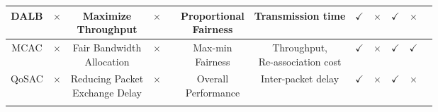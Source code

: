\begin{table*}
\begin{tabular}{|c|c|c|c|c|c|c|c|c|c|c|c|}
		DALB \cite{Demand-aware-LB-Association-15}& $\times$ & \makecell{Maximize\\ Throughput}  &$\times$&  & \makecell{Proportional\\ Fairness} &Transmission time&$\checkmark$&$\times$&$\checkmark$&$\times$\\\hline
		MCAC \cite{Migration-DAM}& $\times$ & \makecell{Fair Bandwidth\\ Allocation}  &$\times$&  & \makecell{Max-min\\ Fairness}  &\makecell{Throughput,\\Re-association cost}&$\checkmark$&\tiny$\times$&$\checkmark$&$\checkmark$		\\\hline
		QoSAC \cite{flow-level-DAM} & $\times$ & \makecell{Reducing Packet \\ Exchange Delay} &$\times$ &  & \makecell{Overall\\ Performance}  &Inter-packet delay&$\checkmark$&$\times$&$\checkmark$&$\times$
		\\\Xhline{3\arrayrulewidth}
	\end{tabular}
\end{table*}



